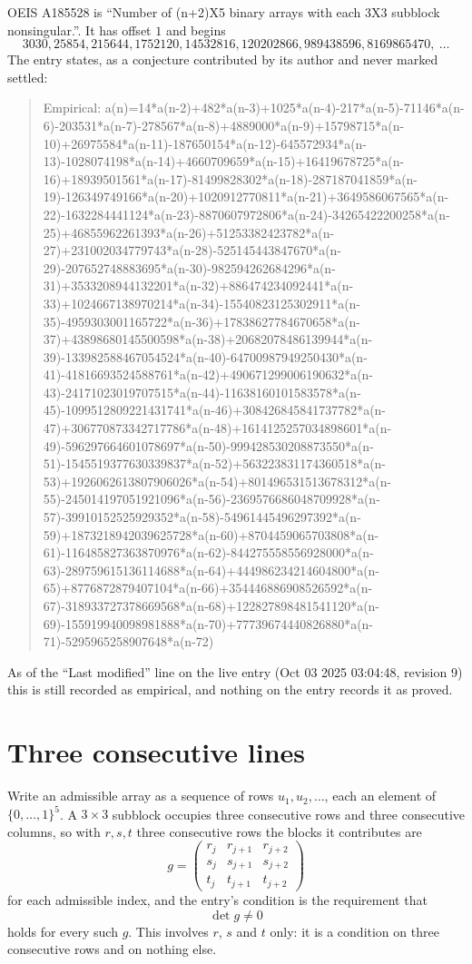 \documentclass[11pt,a4paper]{article}
\theoremstyle{plain}
\theoremstyle{definition}
\begin{document}
OEIS A185528 is ``Number of (n+2)X5 binary arrays with each 3X3 subblock nonsingular.''. It has offset $1$ and begins
\[
3030, 25854, 215644, 1752120, 14532816, 120202866, 989438596, 8169865470,\ \dots
\]
The entry states, as a conjecture contributed by its author and never marked settled:
\begin{quote}
Empirical: a(n)=14*a(n-2)+482*a(n-3)+1025*a(n-4)-217*a(n-5)-71146*a(n-6)-203531*a(n-7)-278567*a(n-8)+4889000*a(n-9)+15798715*a(n-10)+26975584*a(n-11)-187650154*a(n-12)-645572934*a(n-13)-1028074198*a(n-14)+4660709659*a(n-15)+16419678725*a(n-16)+18939501561*a(n-17)-81499828302*a(n-18)-287187041859*a(n-19)-126349749166*a(n-20)+1020912770811*a(n-21)+3649586067565*a(n-22)-1632284441124*a(n-23)-8870607972806*a(n-24)-34265422200258*a(n-25)+46855962261393*a(n-26)+51253382423782*a(n-27)+231002034779743*a(n-28)-525145443847670*a(n-29)-207652748883695*a(n-30)-982594262684296*a(n-31)+3533208944132201*a(n-32)+886474234092441*a(n-33)+1024667138970214*a(n-34)-15540823125302911*a(n-35)-4959303001165722*a(n-36)+17838627784670658*a(n-37)+43898680145500598*a(n-38)+20682078486139944*a(n-39)-133982588467054524*a(n-40)-64700987949250430*a(n-41)-41816693524588761*a(n-42)+490671299006190632*a(n-43)-24171023019707515*a(n-44)-11638160101583578*a(n-45)-1099512809221431741*a(n-46)+308426845841737782*a(n-47)+306770873342717786*a(n-48)+1614125257034898601*a(n-49)-596297664601078697*a(n-50)-999428530208873550*a(n-51)-1545519377630339837*a(n-52)+563223831174360518*a(n-53)+1926062613807906026*a(n-54)+801496531513678312*a(n-55)-245014197051921096*a(n-56)-2369576686048709928*a(n-57)-39910152525929352*a(n-58)-54961445496297392*a(n-59)+1873218942039625728*a(n-60)+8704459065703808*a(n-61)-116485827363870976*a(n-62)-844275558556928000*a(n-63)-289759615136114688*a(n-64)+444986234214604800*a(n-65)+8776872879407104*a(n-66)+354446886908526592*a(n-67)-318933727378669568*a(n-68)+122827898481541120*a(n-69)-155919940098981888*a(n-70)+77739674440826880*a(n-71)-5295965258907648*a(n-72)
\end{quote}
As of the ``Last modified'' line on the live entry (Oct 03 2025 03:04:48, revision 9) this is still
recorded as empirical, and nothing on the entry records it as proved.

\section{Three consecutive lines}

Write an admissible array as a sequence of rows $u_1,u_2,\dots$, each an element of
$\{0,\dots,1\}^{5}$. A $3\times3$ subblock occupies three consecutive rows and
three consecutive columns, so with $r,s,t$ three consecutive rows the blocks it
contributes are
\[
g=\begin{pmatrix}r_j&r_{j+1}&r_{j+2}\\ s_j&s_{j+1}&s_{j+2}\\ t_j&t_{j+1}&t_{j+2}\end{pmatrix}
\]
for each admissible index, and the entry's condition is the requirement that
\[
\det g \ne 0
\]
holds for every such $g$. This involves $r$, $s$ and $t$ only: it is a condition on
three consecutive rows and on nothing else.
\end{document}

